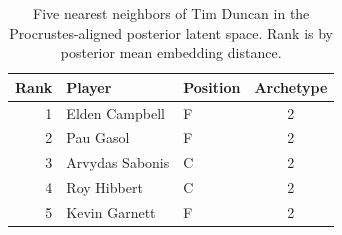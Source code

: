 \begin{table}[htbp]
  \centering\small
  \begin{tabular}{rllc}
    \toprule
    Rank & Player & Position & Archetype \\
    \midrule
    1 & Elden Campbell & F & 2 \\
    2 & Pau Gasol & F & 2 \\
    3 & Arvydas Sabonis & C & 2 \\
    4 & Roy Hibbert & C & 2 \\
    5 & Kevin Garnett & F & 2 \\
    \bottomrule
  \end{tabular}
  \caption{Five nearest neighbors of Tim Duncan in the Procrustes-aligned posterior latent space. Rank is by posterior mean embedding distance.}
  \label{tab:Tim_Duncan_neighbors}
\end{table}

